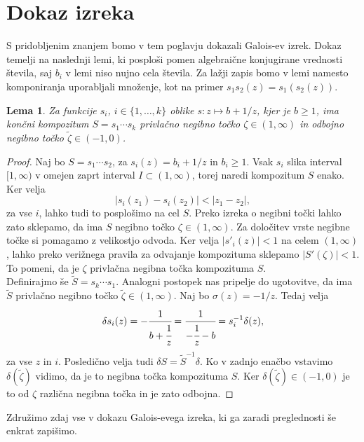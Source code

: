 \documentclass[a4paper,12pt]{article}
\newtheorem{lema}{Lema}
\newenvironment{dokaz}[1][Dokaz]{\begin{proof}}{\end{proof}}
\begin{document}

\section{Dokaz izreka}

S pridobljenim znanjem bomo v tem poglavju dokazali Galois-ev izrek. Dokaz temelji na naslednji lemi, ki posploši pomen algebraične konjugirane vrednosti števila, saj $b_i$ v lemi niso nujno cela števila. Za lažji zapis bomo v lemi namesto komponiranja uporabljali množenje, kot na primer $s_1s_2(z) = s_1(s_2(z))$.

\begin{lema}
    Za funkcije $s_i$, $i \in \{1, \ldots, k\}$ oblike $s : z \mapsto b + 1/z$, kjer je $b \geq 1$, ima končni kompozitum $S = s_1 \cdots s_k$ privlačno negibno točko $\zeta \in (1, \infty)$ in odbojno negibno točko $\tilde{\zeta} \in (-1, 0)$. 
\end{lema}
\begin{dokaz}
    Naj bo $S = s_1 \cdots s_2$, za $s_i(z) = b_i + 1/z$ in $b_i \geq 1$. Vsak $s_i$ slika interval $[1, \infty)$ v omejen zaprt interval $I \subset (1, \infty)$, torej naredi kompozitum $S$ enako. Ker velja
    \[
        |s_i(z_1) - s_i(z_2)| < |z_1 - z_2|,
    \]
    za vse $i$, lahko tudi to posplošimo na cel $S$. 
    Preko izreka o negibni točki lahko zato sklepamo, da ima $S$ negibno točko $\zeta \in (1, \infty)$. Za določitev vrste negibne točke si pomagamo z velikostjo odvoda. Ker velja $|s'_i(z)| < 1$ na celem $(1, \infty)$, lahko preko verižnega pravila za odvajanje kompozituma sklepamo $|S'(\zeta)| < 1$. To pomeni, da je $\zeta$ privlačna negibna točka kompozituma $S$.\\
    Definirajmo še $\tilde{S} = s_k \cdots s_1$. Analogni postopek nas pripelje do ugotovitve, da ima $\tilde{S}$ privlačno negibno točko $\tilde{\zeta} \in (1, \infty)$. Naj bo $\sigma(z) = -1/z$. Tedaj velja
    \[
        \delta s_i (z) = - \cfrac{1}{b + \cfrac{1}{z}} = \cfrac{1}{-\cfrac{1}{z} - b} = s^{-1}_i \delta (z),
    \]
    za vse $z$ in $i$. Posledično velja tudi $\delta S = \tilde{S}^{-1} \delta$. Ko v zadnjo enačbo vstavimo $\delta (\tilde{\zeta})$ vidimo, da je to negibna točka kompozituma $S$. Ker $\delta (\tilde{\zeta}) \in (-1, 0)$ je to od $\zeta$ različna negibna točka in je zato odbojna.
\end{dokaz}

Združimo zdaj vse v dokazu Galois-evega izreka, ki ga zaradi preglednosti še enkrat zapišimo.
\end{document}
